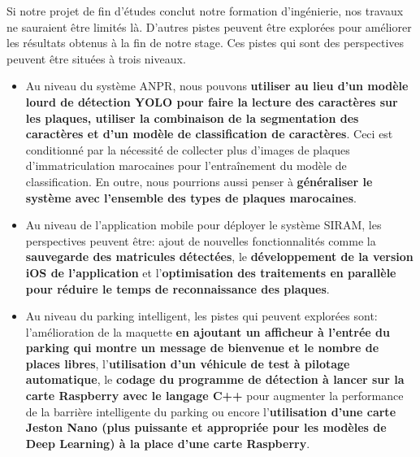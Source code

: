 Si notre projet de fin d’études conclut notre formation d’ingénierie, nos travaux ne sauraient être limités là. D’autres pistes peuvent être explorées pour améliorer les résultats obtenus à la fin de notre stage. Ces pistes qui sont des perspectives peuvent être situées à trois niveaux.
    \begin{itemize}
        \item Au niveau du système ANPR, nous pouvons \textbf{utiliser au lieu d’un modèle lourd de détection YOLO pour faire la lecture des caractères sur les plaques, utiliser la combinaison de la segmentation des caractères et d’un modèle de classification de caractères}. Ceci est conditionné par la nécessité de collecter plus d’images de plaques d’immatriculation marocaines pour l'entraînement du modèle de classification. En outre, nous pourrions aussi penser à \textbf{généraliser le système avec l'ensemble des types de plaques marocaines}.
        
        \item Au niveau de l’application mobile pour déployer le système SIRAM, les perspectives peuvent être: ajout de nouvelles fonctionnalités comme la \textbf{sauvegarde des matricules détectées}, le \textbf{développement de la version iOS de l’application} et l’\textbf{optimisation des traitements en parallèle pour réduire le temps de reconnaissance des plaques}.
        
        \item Au niveau du parking intelligent, les pistes qui peuvent explorées sont: l’amélioration de la maquette \textbf{en ajoutant un afficheur à l'entrée du parking qui montre un message de bienvenue et le nombre de places libres}, l’\textbf{utilisation d'un véhicule de test à pilotage automatique}, le \textbf{codage du programme de détection à lancer sur la carte Raspberry avec le langage C++} pour augmenter la performance de la barrière intelligente du parking ou encore l'\textbf{utilisation d'une carte Jeston Nano (plus puissante et appropriée pour les modèles de Deep Learning) à la place d'une carte Raspberry}.
    \end{itemize}